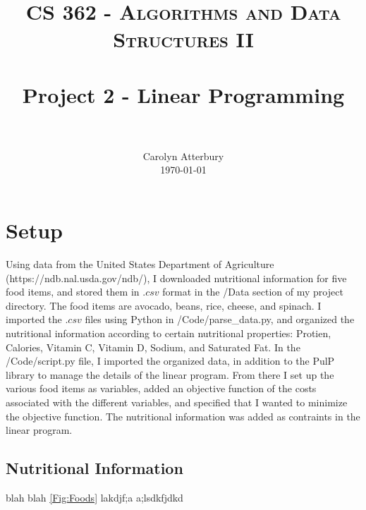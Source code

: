 \documentclass[paper=a4, fontsize=11pt]{scrartcl}
\title{
		\usefont{OT1}{bch}{b}{n}
		\normalfont \normalsize \textsc{CS 362 - Algorithms and Data Structures II} \\ [25pt]
		\horrule{0.5pt} \\[0.4cm]
		\huge Project 2 - Linear Programming \\
		\horrule{2pt} \\[0.5cm]
}
\author{
		\normalfont 								\normalsize
        Carolyn Atterbury\\[-3pt]		\normalsize
        \today
}
\date{}
\numberwithin{equation}{section}		%
\numberwithin{figure}{section}			%
\numberwithin{table}{section}				%
\begin{document}
\maketitle
\section{Setup}
Using data from the United States Department of Agriculture (https://ndb.nal.usda.gov/ndb/), I downloaded nutritional information for five food items, and stored them in $.csv$ format in the /Data section of my project directory. The food items are avocado, beans, rice, cheese, and spinach. I imported the $.csv$ files using Python in /Code/parse\_data.py, and organized the nutritional information according to certain nutritional properties: Protien, Calories, Vitamin C, Vitamin D, Sodium, and Saturated Fat. In the /Code/script.py file, I imported the organized data, in addition to the PulP library to manage the details of the linear program. From there I set up the various food items as variables, added an objective function of the costs associated with the different variables, and specified that I wanted to minimize the objective function. The nutritional information was added as contraints in the linear program. 


\subsection{Nutritional Information}
blah blah \autoref{Fig:Foods} lakdjf;a a;lsdkfjdkd 
\end{document}
